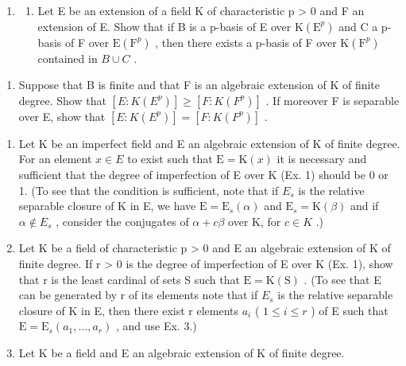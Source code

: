 \begin{enumerate}
\def\labelenumi{\arabic{enumi})}
\setcounter{enumi}{1}
\tightlist
\item
  \begin{enumerate}
  \def\labelenumii{\alph{enumii})}
  \tightlist
  \item
    Let E be an extension of a field K of characteristic p \textgreater{} 0 and F an extension of E. Show that if B is a p-basis of E over \(\mathrm{K}(\mathrm{E}^{p})\) and C a p-basis of F over \(\mathrm{E}(\mathrm{F}^{p})\) , then there exists a p-basis of F over \(\mathrm{K}(\mathrm{F}^{p})\) contained in \(B \cup C\) .
  \end{enumerate}
\end{enumerate}

\begin{enumerate}
\def\labelenumi{\alph{enumi})}
\setcounter{enumi}{1}
\tightlist
\item
  Suppose that B is finite and that F is an algebraic extension of K of finite degree. Show that \([E:K(E^{p})]\geqslant[F:K(F^{p})]\) . If moreover F is separable over E, show that \([E:K(E^{p})]=[F:K(F^{p})]\) .
\end{enumerate}

\begin{enumerate}
\def\labelenumi{\arabic{enumi})}
\setcounter{enumi}{2}
\item
  Let K be an imperfect field and E an algebraic extension of K of finite degree. For an element \(x \in E\) to exist such that \(\mathrm{E} = \mathrm{K}(x)\) it is necessary and sufficient that the degree of imperfection of E over K (Ex. 1) should be 0 or 1. (To see that the condition is sufficient, note that if \(E_{s}\) is the relative separable closure of K in E, we have \(\mathrm{E} = \mathrm{E}_{s}(\alpha)\) and \(\mathrm{E}_{s} = \mathrm{K}(\beta)\) and if \(\alpha \notin E_{s}\) , consider the conjugates of \(\alpha + c\beta\) over K, for \(c \in K\) .)
\item
  Let K be a field of characteristic p \textgreater{} 0 and E an algebraic extension of K of finite degree. If r \textgreater{} 0 is the degree of imperfection of E over K (Ex. 1), show that r is the least cardinal of sets S such that \(\mathrm{E} = \mathrm{K}(\mathrm{S})\) . (To see that E can be generated by r of its elements note that if \(E_{s}\) is the relative separable closure of K in E, then there exist r elements \(a_{i}\) ( \(1 \leqslant i \leqslant r\) ) of E such that \(\mathrm{E} = \mathrm{E}_{s}(a_{1}, \ldots, a_{r})\) , and use Ex. 3.)
\item
  Let K be a field and E an algebraic extension of K of finite degree.
\end{enumerate}

